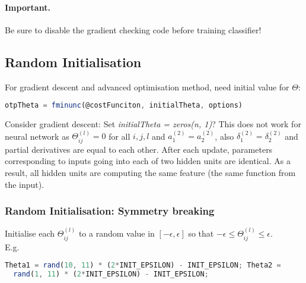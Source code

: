 \documentclass{scrartcl}
\begin{document}
\paragraph{Important.}
Be sure to disable the gradient checking code before training
classifier!

\subsection{Random Initialisation}
\label{sec:9-6}
For gradient descent and advanced optimisation method, need initial
value for $\Theta$:
\begin{lstlisting}[language=Octave]
  otpTheta = fminunc(@costFunciton, initialTheta, options)
\end{lstlisting}
Consider gradient descent: Set {\it initialTheta = zeros(n, 1)}? This
does not work for neural network as $\Theta_{ij}^{(l)} = 0$ for all
$i, j, l$ and $a_1^{(2)} = a_2^{(2)}$, also $\delta_1^{(2)} =
\delta_2^{(2)}$ and partial derivatives are equal to each other. After
each update, parameters corresponding to inputs going into each of two
hidden units are identical. As a result, all hidden units are
computing the same feature (the same function from the input).

\subsubsection{Random Initialisation: Symmetry breaking}
\label{sec:9-6-1}
Initialise each $\Theta_{ij}^{(l)}$ to a random value in $[ -\epsilon,
\epsilon ]$ so that $-\epsilon \leq \Theta_{ij}^{(l)} \leq \epsilon$.
\\
E.g.
\begin{lstlisting}[language=Octave]
  Theta1 = rand(10, 11) * (2*INIT_EPSILON) - INIT_EPSILON; Theta2 =
  rand(1, 11) * (2*INIT_EPSILON) - INIT_EPSILON;
\end{lstlisting}
\end{document}
